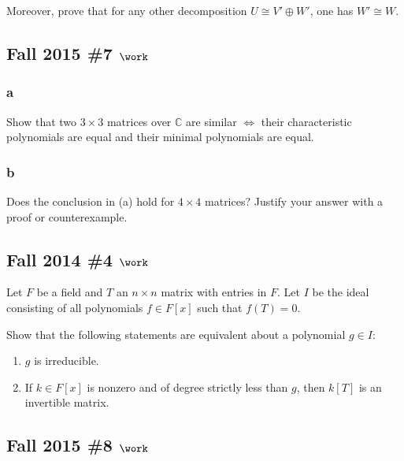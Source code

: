 Moreover, prove that for any other decomposition
\(U \cong V' \oplus W'\), one has \(W' \cong W\).

\hypertarget{fall-2015-7-work}{%
\subsection{\texorpdfstring{Fall 2015 \#7
\(\work\)}{Fall 2015 \#7 \textbackslash work}}\label{fall-2015-7-work}}

\hypertarget{a-99}{%
\subsubsection{a}\label{a-99}}

Show that two \(3\times 3\) matrices over \({\mathbb{C}}\) are similar
\(\iff\) their characteristic polynomials are equal and their minimal
polynomials are equal.

\hypertarget{b-89}{%
\subsubsection{b}\label{b-89}}

Does the conclusion in (a) hold for \(4\times 4\) matrices? Justify your
answer with a proof or counterexample.

\hypertarget{fall-2014-4-work}{%
\subsection{\texorpdfstring{Fall 2014 \#4
\(\work\)}{Fall 2014 \#4 \textbackslash work}}\label{fall-2014-4-work}}

Let \(F\) be a field and \(T\) an \(n\times n\) matrix with entries in
\(F\). Let \(I\) be the ideal consisting of all polynomials
\(f\in F[x]\) such that \(f(T) =0\).

Show that the following statements are equivalent about a polynomial
\(g\in I\):

\begin{enumerate}
\def\labelenumi{\alph{enumi}.}
\item
  \(g\) is irreducible.
\item
  If \(k\in F[x]\) is nonzero and of degree strictly less than \(g\),
  then \(k[T]\) is an invertible matrix.
\end{enumerate}

\hypertarget{fall-2015-8-work}{%
\subsection{\texorpdfstring{Fall 2015 \#8
\(\work\)}{Fall 2015 \#8 \textbackslash work}}\label{fall-2015-8-work}}

